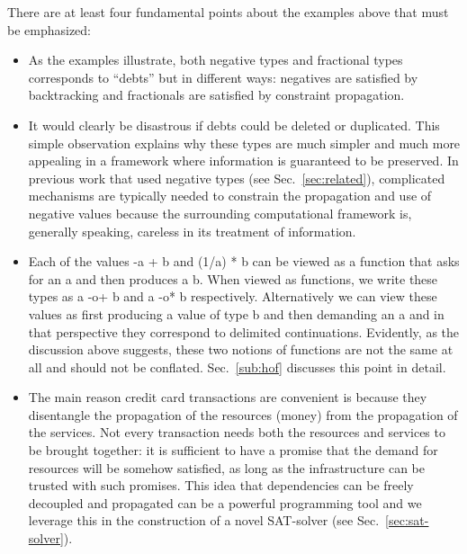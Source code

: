 \documentclass[preprint]{sigplanconf}
\begin{document}
There are at least four fundamental points about the examples above that must
be emphasized:

\begin{itemize}
\item As the examples illustrate, both negative types and fractional types
  corresponds to ``debts'' but in different ways: negatives are satisfied by
  backtracking and fractionals are satisfied by constraint propagation.

\item It would clearly be disastrous if debts could be deleted or
  duplicated. This simple observation explains why these types are much
  simpler and much more appealing in a framework where information is
  guaranteed to be preserved. In previous work that used negative types (see
  Sec.~\ref{sec:related}), complicated mechanisms are typically needed to
  constrain the propagation and use of negative values because the
  surrounding computational framework is, generally speaking, careless in its
  treatment of information.

\item Each of the values {{-a + b}} and {{(1/a) * b}} can be viewed as a
  function that asks for an {{a}} and then produces a {{b}}. When viewed as
  functions, we write these types as {{a -o+ b}} and {{a -o* b}}
  respectively. Alternatively we can view these values as first producing a
  value of type {{b}} and then demanding an {{a}} and in that perspective
  they correspond to delimited continuations. Evidently, as the discussion
  above suggests, these two notions of functions are not the same at all and
  should not be conflated. Sec.~\ref{sub:hof} discusses this point in detail.

\item The main reason credit card transactions are convenient is because they
  disentangle the propagation of the resources (money) from the propagation
  of the services. Not every transaction needs both the resources and
  services to be brought together: it is sufficient to have a promise that
  the demand for resources will be somehow satisfied, as long as the
  infrastructure can be trusted with such promises. This idea that
  dependencies can be freely decoupled and propagated can be a powerful
  programming tool and we leverage this in the construction of a novel
  SAT-solver (see Sec.~\ref{sec:sat-solver}).
\end{itemize}
\end{document}
